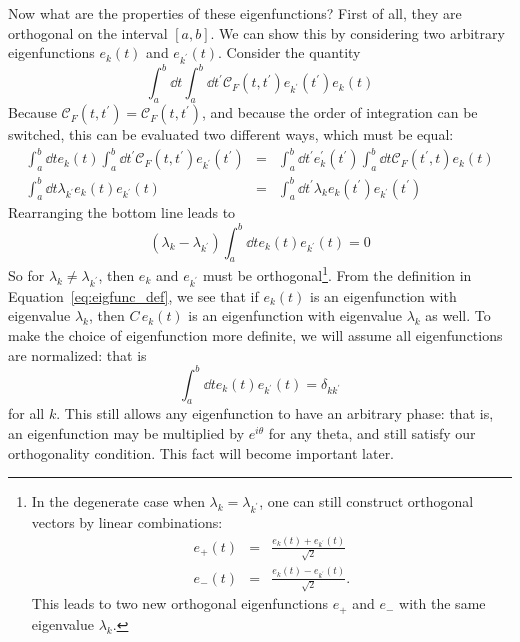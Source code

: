 Now what are the properties of these eigenfunctions?  First of all, they
are orthogonal on the interval $[a, b]$.
We can show this by considering two arbitrary eigenfunctions
$e_k(t)$ and $e_{k^\prime}(t)$.  Consider the quantity
\begin{equation}
  \int_a^b \dd t \int_a^b \dd t^\prime \mathcal{C}_F(t, t^\prime)
  e_{k^\prime}(t^\prime) e_k(t)
\end{equation}
Because $\mathcal{C}_F(t, t^\prime) = \mathcal{C}_F(t, t^\prime)$, and
because the order of integration can be switched, this can be evaluated
two different ways, which must be equal:
\begin{eqnarray}
  \int_a^b \dd t e_k(t)
  \int_a^b \dd t^\prime \mathcal{C}_F(t, t^\prime) e_{k^\prime}(t^\prime) &=&
  \int_a^b \dd t^\prime e_k^\prime(t^\prime)
  \int_a^b \dd t \mathcal{C}_F(t^\prime, t) e_{k}(t)
  \nonumber\\
  \int_a^b \dd t \lambda_{k^\prime} e_k(t) e_{k^\prime}(t) &=&
  \int_a^b \dd t^\prime \lambda_k e_k(t^\prime) e_{k^\prime}(t^\prime)
\end{eqnarray}
Rearranging the bottom line leads to
\begin{equation}
  (\lambda_k - \lambda_{k^\prime})
  \int_a^b \dd t e_k(t) e_{k^\prime}(t) = 0
\end{equation}
So for $\lambda_k \ne \lambda_{k^\prime}$, then $e_k$ and $e_{k^\prime}$
must be orthogonal\footnote{In the degenerate case when
$\lambda_k = \lambda_{k^\prime}$, one can still construct orthogonal
vectors by linear combinations:
\begin{eqnarray}
  e_+(t) &=& \frac{e_k(t) + e_{k^\prime}(t)}{\sqrt{2}} \nonumber\\
  e_-(t) &=& \frac{e_k(t) - e_{k^\prime}(t)}{\sqrt{2}}. \nonumber
\end{eqnarray}
This leads to two new orthogonal eigenfunctions $e_+$ and $e_-$ with the
same eigenvalue $\lambda_k$.}.  From the definition in
Equation~\ref{eq:eigfunc_def}, we see that if $e_k(t)$ is an eigenfunction
with eigenvalue $\lambda_k$,
then $C\, e_k(t)$ is an eigenfunction with eigenvalue $\lambda_k$ as well.
To make the choice of eigenfunction more definite, we will assume all
eigenfunctions are normalized: that is
\begin{equation}
  \int_a^b \dd t e_k(t) e_{k^\prime}(t) = \delta_{kk^\prime}
\end{equation}
for all $k$.  This still allows any eigenfunction to have an arbitrary
phase: that is, an eigenfunction may be multiplied by $e^{i\theta}$ for
any theta, and still satisfy our orthogonality condition.  This fact
will become important later.


